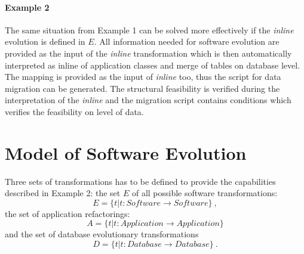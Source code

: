 \documentclass[runningheads]{comsis}
\begin{document}
\paragraph{Example 2} The same situation from Example 1 can be solved more effectively if the \emph{inline} evolution is defined in $E$. All information needed for software evolution are provided as the input of the \emph{inline} transformation which is then automatically interpreted as inline of application classes and merge of tables on database level. The mapping is provided as the input of \emph{inline} too, thus the script for data migration can be generated. The structural feasibility is verified during the interpretation of the \emph{inline} and the migration script contains conditions which verifies the feasibility on level of data.





\section{Model of Software Evolution}
\label{sec:models}
Three sets of transformations has to be defined to provide the capabilities described in Example 2: the set $E$ of all possible software transformations:
\begin{equation}
E = \{t | t: Software \rightarrow Software\}\:,
\end{equation}
the set of application refactorings:
\begin{equation}
	A = \{t | t: Application \rightarrow Application\}
\end{equation}
and the set of database evolutionary transformations
\begin{equation}
 D = \{t | t: Database \rightarrow Database\}\:.
\end{equation}
\end{document}
